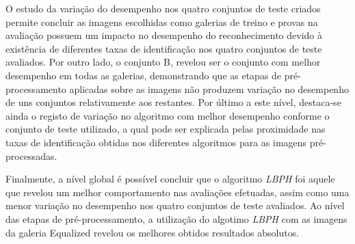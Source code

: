 O estudo da variação do desempenho nos quatro conjuntos de teste criados permite concluir as imagens escolhidas como galerias de treino e provas na avaliação possuem um impacto no desempenho do reconhecimento
devido à existência de diferentes taxas de identificação nos quatro conjuntos de teste avaliados. Por outro lado, o conjunto B, revelou ser o conjunto com melhor desempenho em todas as galerias, demonstrando que as etapas de pré-processamento aplicadas sobre as imagens não produzem variação no desempenho de uns conjuntos relativamente aos restantes. Por último a este nível, destaca-se ainda o registo de variação no algoritmo com melhor desempenho conforme o conjunto de teste utilizado, a qual pode ser explicada pelas proximidade nas taxas de identificação obtidas nos diferentes algoritmos para as imagens pré-processadas. 

Finalmente, a nível global é possível concluir que o algoritmo \textit{LBPH} foi aquele que revelou um melhor comportamento nas avaliações efetuadas, assim como uma menor variação no desempenho nos quatro conjuntos de teste avaliados. Ao nível das etapas de pré-processamento, a utilização do algotimo \textit{LBPH} com as imagens da galeria Equalized revelou os melhores obtidos resultados absolutos.